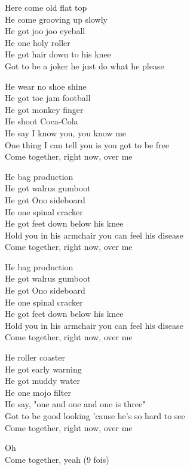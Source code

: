 

Here come old flat top \\
He come grooving up slowly \\
He got joo joo eyeball \\
He one holy roller \\
He got hair down to his knee \\
Got to be a joker he just do what he please \\



He wear no shoe shine \\
He got toe jam football \\
He got monkey finger \\
He shoot Coca-Cola \\
He say I know you, you know me \\
One thing I can tell you is you got to be free \\
Come together, right now, over me \\



He bag production \\
He got walrus gumboot \\
He got Ono sideboard \\
He one spinal cracker \\
He got feet down below his knee \\
Hold you in his armchair you can feel his disease \\
Come together, right now, over me \\





He bag production \\
He got walrus gumboot \\
He got Ono sideboard \\
He one spinal cracker \\
He got feet down below his knee \\
Hold you in his armchair you can feel his disease \\
Come together, right now, over me \\






He roller coaster \\
He got early warning \\
He got muddy water \\
He one mojo filter \\
He say, "one and one and one is three" \\
Got to be good looking 'cause he's so hard to see \\
Come together, right now, over me \\



Oh \\
Come together, yeah (9 fois) \\

